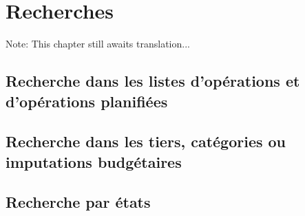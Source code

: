 
\chapter{Recherches\label{search} }

Note: This chapter still awaits translation...

\section{Recherche dans les listes d'opérations et d'opérations planifiées\label{search-list} }


\section{Recherche dans les tiers, catégories ou imputations budgétaires\label{search-simple} }

\section{Recherche par états\label{search-advanced} }



